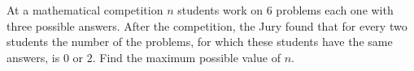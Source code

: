 At a mathematical competition $n$ students work on $6$ problems each one with three possible answers. After the competition, the Jury found that for every two students the number of the problems, for which these students have the same answers, is $0$ or $2$.  Find the maximum possible value of $n$.